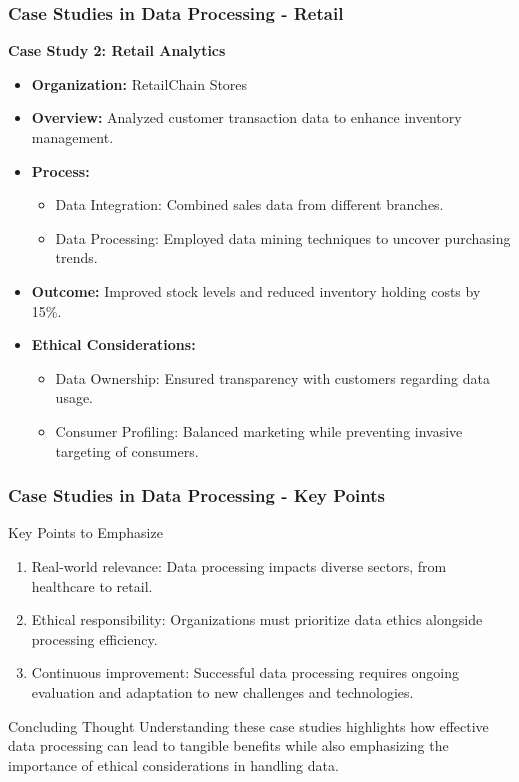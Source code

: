 \documentclass[aspectratio=169]{beamer}
\begin{document}
\begin{frame}[fragile]
    \frametitle{Case Studies in Data Processing - Retail}
    \textbf{Case Study 2: Retail Analytics}  
    \begin{itemize}
        \item \textbf{Organization:} RetailChain Stores
        \item \textbf{Overview:} Analyzed customer transaction data to enhance inventory management.
        \item \textbf{Process:}
            \begin{itemize}
                \item Data Integration: Combined sales data from different branches.
                \item Data Processing: Employed data mining techniques to uncover purchasing trends.
            \end{itemize}
        \item \textbf{Outcome:} Improved stock levels and reduced inventory holding costs by 15\%.
        \item \textbf{Ethical Considerations:}
            \begin{itemize}
                \item Data Ownership: Ensured transparency with customers regarding data usage.
                \item Consumer Profiling: Balanced marketing while preventing invasive targeting of consumers.
            \end{itemize}
    \end{itemize}
\end{frame}

\begin{frame}[fragile]
    \frametitle{Case Studies in Data Processing - Key Points}
    \begin{block}{Key Points to Emphasize}
        \begin{enumerate}
            \item Real-world relevance: Data processing impacts diverse sectors, from healthcare to retail.
            \item Ethical responsibility: Organizations must prioritize data ethics alongside processing efficiency.
            \item Continuous improvement: Successful data processing requires ongoing evaluation and adaptation to new challenges and technologies.
        \end{enumerate}
    \end{block}

    \begin{block}{Concluding Thought}
        Understanding these case studies highlights how effective data processing can lead to tangible benefits while also emphasizing the importance of ethical considerations in handling data. 
    \end{block}
\end{frame}
\end{document}
